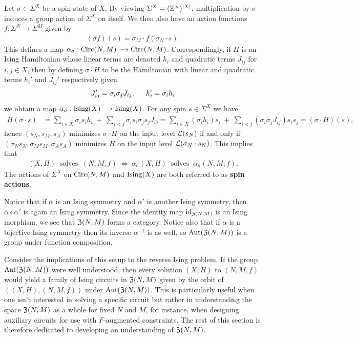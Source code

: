 \documentclass{article}
\begin{document}
\begin{example}\label{ex:spinaction}
  Let $\sigma \in \Sigma^X$ be a spin state of $X$. By viewing $\Sigma^X = (\mathbb{Z}^\times)^{|X|}$, multiplication by $\sigma$ induces a group action of $\Sigma^X$ on itself. We then also have an action functions $f:\Sigma^N \to \Sigma^M$ given by
  \begin{align*}
    (\sigma f)(s) = \sigma_M \cdot f(\sigma_N \cdot s).
  \end{align*}
  This defines a map $\alpha_\sigma: \Circ(N,M) \to \Circ(N,M)$. Correspondingly, if $H$ is an Ising Hamiltonian whose linear terms are denoted $h_i$ and quadratic terms $J_{ij}$ for $i,j \in X$, then by defining $\sigma \cdot H$ to be the Hamiltonian with linear and quadratic terms $h_i'$ and $J_{ij}'$ respectively given
  \begin{align*}
    J_{ij}' = \sigma_i\sigma_j J_{ij}, \hspace{1.5em} h_i' = \sigma_i h_i
  \end{align*}
  we obtain a map $\alpha_\sigma: \Ising(X) \to \Ising(X)$. For any spin $s\in \Sigma^X$ we have
  \begin{align*}
    H(\sigma \cdot s) 
      &= \sum_{i\in X} \sigma_i s_i h_i ~+~ \sum_{i < j} \sigma_{i} s_i \sigma_j s_j J_{ij}  = \sum_{i\in X} (\sigma_i h_i) s_i ~+~ \sum_{i<j} (\sigma_i\sigma_j J_{ij}) s_is_j = (\sigma \cdot H)(s),
  \end{align*}
  hence $(s_N, s_M, s_A)$ minimizes $\sigma \cdot H$ on the input level $\mathcal{L}(s_N)$ if and only if $(\sigma_N s_N, \sigma_M s_M, \sigma_A s_A)$ minimizes $H$ on the input level $\mathcal{L}(\sigma_N\cdot s_N)$. This implies that
  \begin{align*}
    (X,H) ~ \text{ solves } ~ (N,M,f) ~\Leftrightarrow ~ \alpha_\sigma (X,H) ~ \text{ solves } ~ \alpha_\sigma (N,M,f).
  \end{align*}
  The actions of $\Sigma^X$ on $\operatorname{Circ}(N,M)$ and $\operatorname{Ising}(X)$ are both referred to as \textbf{spin actions}.
\end{example}

Notice that if $\alpha$ is an Ising symmetry and $\alpha'$ is another Ising symmetry, then $\alpha\circ \alpha'$ is again an Ising symmetry. Since the identity map $\operatorname{id}_{\operatorname{\mathfrak{Z}}(N,M)}$ is an Ising morphism, we see that $\operatorname{\mathfrak{Z}}(N,M)$ forms a category. Notice also that if $\alpha$ is a bijective Ising symmetry then its inverse $\alpha^{-1}$ is as well, so $\operatorname{Aut}(\operatorname{\mathfrak{Z}}(N,M))$ is a group under function composition.

Consider the implications of this setup to the reverse Ising problem. If the group $\operatorname{Aut}(\operatorname{\mathfrak{Z}}(N,M))$ were well understood, then every solution $(X,H)$ to $(N,M,f)$ would yield a family of Ising circuits in $\operatorname{\mathfrak{Z}}(N,M)$ given by the orbit of $((X,H), (N,M,f))$ under $\operatorname{Aut}(\operatorname{\mathfrak{Z}}(N,M))$. This is particularly useful when one isn't interested in solving a specific circuit but rather in understanding the space $\operatorname{\mathfrak{Z}}(N,M)$ as a whole for fixed $N$ and $M$, for instance, when designing auxiliary circuits for use with $F$-augmented constraints. The rest of this section is therefore dedicated to developing an understanding of $\operatorname{\mathfrak{Z}}(N,M)$.
\end{document}
